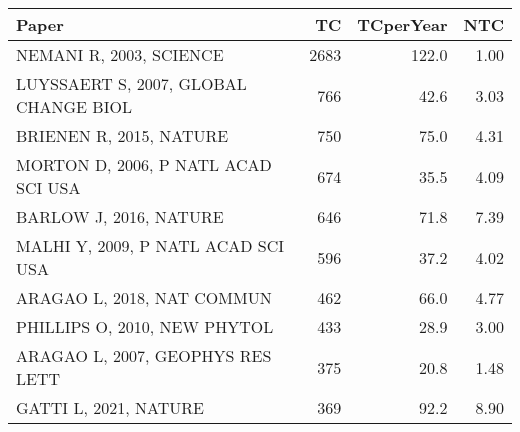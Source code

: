 
\begin{tabular}{lrrr}
\toprule
Paper & TC & TCperYear & NTC\\
\midrule
NEMANI R, 2003, SCIENCE & 2683 & 122.0 & 1.00\\
LUYSSAERT S, 2007, GLOBAL CHANGE BIOL & 766 & 42.6 & 3.03\\
BRIENEN R, 2015, NATURE & 750 & 75.0 & 4.31\\
MORTON D, 2006, P NATL ACAD SCI USA & 674 & 35.5 & 4.09\\
BARLOW J, 2016, NATURE & 646 & 71.8 & 7.39\\
\addlinespace
MALHI Y, 2009, P NATL ACAD SCI USA & 596 & 37.2 & 4.02\\
ARAGAO L, 2018, NAT COMMUN & 462 & 66.0 & 4.77\\
PHILLIPS O, 2010, NEW PHYTOL & 433 & 28.9 & 3.00\\
ARAGAO L, 2007, GEOPHYS RES LETT & 375 & 20.8 & 1.48\\
GATTI L, 2021, NATURE & 369 & 92.2 & 8.90\\
\bottomrule
\end{tabular}